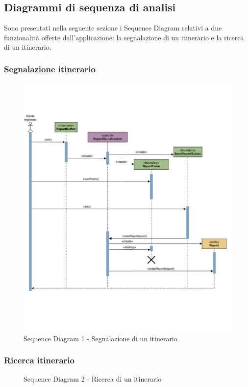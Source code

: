 \documentclass{natourDoc}
\begin{document}
\newpage
\subsection{Diagrammi di sequenza di analisi}
Sono presentati nella seguente sezione i Sequence Diagram relativi a due funzionalità offerte dall'applicazione:
la segnalazione di un itinerario e la ricerca di un itinerario.
\subsubsection{Segnalazione itinerario}
\begin{figure}[!htbp]
	\centering
	\includegraphics[width=\textwidth, page=1]{./diagrams/sequenceDomain-segnalazioneItinerario.pdf}
	\caption{Sequence Diagram 1 - Segnalazione di un itinerario}
\end{figure}
\FloatBarrier

\newpage
\subsubsection{Ricerca itinerario}
\begin{figure}[!htbp]
	\centering
	
	\caption{Sequence Diagram 2 - Ricerca di un itinerario}
\end{figure}
\FloatBarrier
\end{document}
